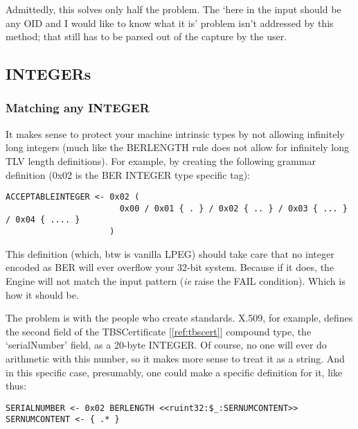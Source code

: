 Admittedly, this solves only half the problem. The ‘here in the input 
should be any OID and I would like to know what it is’ problem isn’t 
addressed by this method; that still has to be parsed out of the capture 
by the user.

\subsection{INTEGERs}

\subsubsection{Matching any INTEGER}
It makes sense to protect your machine intrinsic types by not allowing 
infinitely long integers (much like the BERLENGTH rule does not allow for 
infinitely long TLV length definitions). For example, by creating the 
following grammar definition (0x02 is the BER INTEGER type specific tag):

\begin{changemargin}{-60mm}{0mm}
\begin{myquote}
\begin{verbatim}
ACCEPTABLEINTEGER <- 0x02 (
                       0x00 / 0x01 { . } / 0x02 { .. } / 0x03 { ... } / 0x04 { .... }
                     )
\end{verbatim}
\end{myquote}
\end{changemargin}

This definition (which, btw is vanilla LPEG)
should take care that no integer encoded as BER will ever 
overflow your 32-bit system.
Because if it does, the Engine will not match the input pattern
(\textit{ie} raise the FAIL condition). Which is how it should be.

The problem is with the people who create standards.
X.509, for example, defines the second field 
of the TBSCertificate [\ref{ref:tbscert}]
compound type, the ‘serialNumber’ field, as a 
20-byte INTEGER. Of course, no one will ever do arithmetic with this 
number, so it makes more sense to treat it as a string. And in this specific 
case, presumably, one could make a specific definition for it, like thus:

\begin{changemargin}{-60mm}{0mm}
\begin{myquote}
\begin{verbatim}
SERIALNUMBER <- 0x02 BERLENGTH <<ruint32:$_:SERNUMCONTENT>>
SERNUMCONTENT <- { .* }
\end{verbatim}
\end{myquote}
\end{changemargin}

